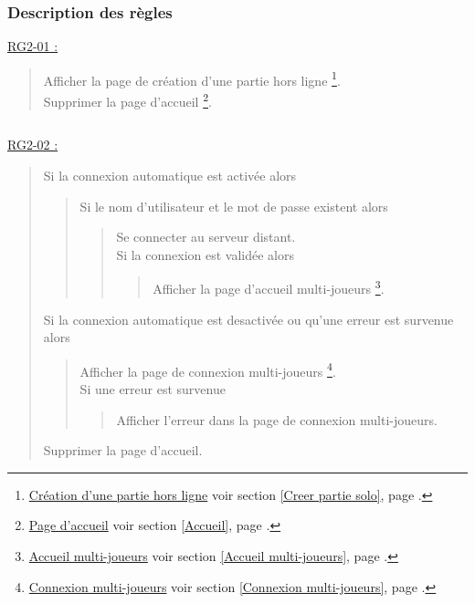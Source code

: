 \documentclass{report}
\begin{document}
\newpage

		\subsubsection{Description des règles}
		
		\underline{RG2-01 :}
			\begin{quote}
				Afficher la page de création d'une partie hors ligne
					\footnote{
						\hyperlink{Creer partie solo}{Création d'une partie hors ligne}
						\og voir section \ref{Creer partie solo}, page \pageref{Creer partie solo}.\fg
					}.\\
				Supprimer la page d'accueil%
					\footnote{
						\hyperlink{Page d'accueil}{Page d'accueil}
						\og voir section \ref{Accueil}, page \pageref{Accueil}.\fg
					}.
			\end{quote}

		$\,$

		\underline{RG2-02 :}
			\begin{quote}
				Si la connexion automatique est activée alors
				\begin{quote}
					Si le nom d'utilisateur et le mot de passe existent alors
					\begin{quote}
						Se connecter au serveur distant.\\
						Si la connexion est validée alors
						\begin{quote}
							Afficher la page d'accueil multi-joueurs%
								\footnote{
									\hyperlink{Accueil multi-joueurs}{Accueil multi-joueurs}
									\og voir section \ref{Accueil multi-joueurs}, page \pageref{Accueil multi-joueurs}.\fg
								}.
						\end{quote}
					\end{quote}	
				\end{quote}
				Si la connexion automatique est desactivée ou qu'une erreur est survenue alors 
				\begin{quote}		
					Afficher la page de connexion multi-joueurs%
						\footnote{
							\hyperlink{Connexion multi-joueurs}{Connexion multi-joueurs}
							\og voir section \ref{Connexion multi-joueurs}, page \pageref{Connexion multi-joueurs}.\fg
						}.\\
					Si une erreur est survenue
					\begin{quote}
						Afficher l'erreur dans la page de connexion multi-joueurs\footnotemark[4].
					\end{quote}
				\end{quote}
				Supprimer la page d'accueil\footnotemark[2].
			\end{quote}
\end{document}
